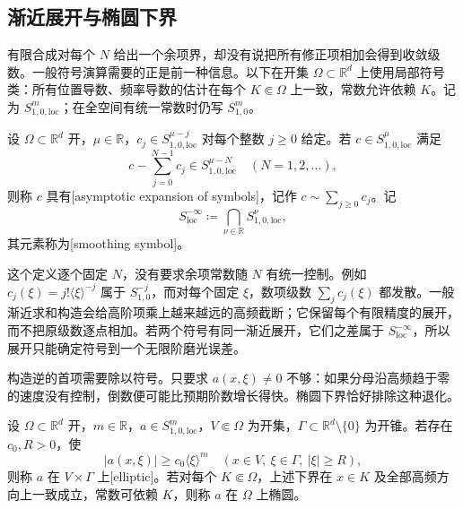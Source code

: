 \subsection{渐近展开与椭圆下界}
\label{b2:subsec:G-asymptotic-ellipticity}

有限合成对每个 \(N\) 给出一个余项界，却没有说把所有修正项相加会得到收敛级数。一般符号演算需要的正是前一种信息。以下在开集 \(\Omega\subset\mathbb R^d\) 上使用局部符号类：所有位置导数、频率导数的估计在每个 \(K\Subset\Omega\) 上一致，常数允许依赖 \(K\)。记为 \(S^m_{1,0,\mathrm{loc}}\)；在全空间有统一常数时仍写 \(S^m_{1,0}\)。

\begin{definition}[符号的渐近展开]
\label{b2:def:G-asymptotic-symbol}
设 \(\Omega\subset\mathbb R^d\) 开，\(\mu\in\mathbb R\)，\(c_j\in S^{\mu-j}_{1,0,\mathrm{loc}}\) 对每个整数 \(j\ge0\) 给定。若 \(c\in S^\mu_{1,0,\mathrm{loc}}\) 满足
\[
 c-\sum_{j=0}^{N-1}c_j\in S^{\mu-N}_{1,0,\mathrm{loc}}
 \quad(N=1,2,\ldots),
\]
则称 \(c\) 具有[asymptotic expansion of symbols]，记作 \(c\sim\sum_{j\ge0}c_j\)。记
\[
 S^{-\infty}_{\mathrm{loc}}
 \coloneqq\bigcap_{\nu\in\mathbb R}S^\nu_{1,0,\mathrm{loc}},
\]
其元素称为[smoothing symbol]。
\end{definition}

这个定义逐个固定 \(N\)，没有要求余项常数随 \(N\) 有统一控制。例如 \(c_j(\xi)=j!\langle\xi\rangle^{-j}\) 属于 \(S^{-j}_{1,0}\)，而对每个固定 \(\xi\)，数项级数 \(\sum_jc_j(\xi)\) 都发散。一般渐近求和构造会给高阶项乘上越来越远的高频截断；它保留每个有限精度的展开，而不把原级数逐点相加。若两个符号有同一渐近展开，它们之差属于 \(S^{-\infty}_{\mathrm{loc}}\)，所以展开只能确定符号到一个无限阶磨光误差。

\ProseParagraphBreak

构造逆的首项需要除以符号。只要求 \(a(x,\xi)\ne0\) 不够：如果分母沿高频趋于零的速度没有控制，倒数便可能比预期阶数增长得快。椭圆下界恰好排除这种退化。

\begin{definition}[锥上的椭圆性]
\label{b2:def:G-conic-ellipticity}
设 \(\Omega\subset\mathbb R^d\) 开，\(m\in\mathbb R\)，\(a\in S^m_{1,0,\mathrm{loc}}\)，\(V\Subset\Omega\) 为开集，\(\Gamma\subset\mathbb R^d\setminus\{0\}\) 为开锥。若存在 \(c_0,R>0\)，使
\begin{equation}\label{b2:eq:G-elliptic-lower-bound}
 |a(x,\xi)|\ge c_0\langle\xi\rangle^m
 \quad(x\in V,\ \xi\in\Gamma,\ |\xi|\ge R),
\end{equation}
则称 \(a\) 在 \(V\times\Gamma\) 上[elliptic]。若对每个 \(K\Subset\Omega\)，上述下界在 \(x\in K\) 及全部高频方向上一致成立，常数可依赖 \(K\)，则称 \(a\) 在 \(\Omega\) 上椭圆。
\end{definition}

